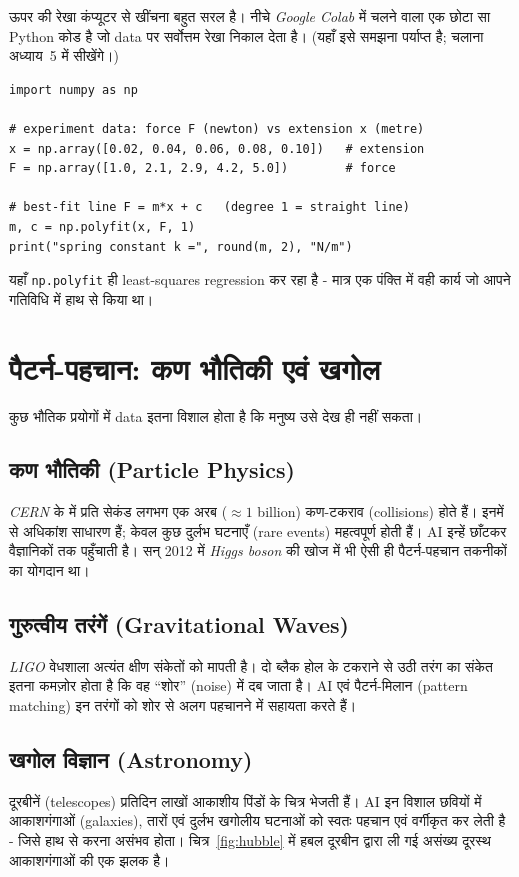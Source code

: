 ऊपर की रेखा कंप्यूटर से खींचना बहुत सरल है। नीचे \emph{Google Colab} में चलने वाला एक
छोटा सा Python कोड है जो data पर सर्वोत्तम रेखा निकाल देता है। (यहाँ इसे समझना पर्याप्त
है; चलाना अध्याय~5 में सीखेंगे।)

\begin{lstlisting}
import numpy as np

# experiment data: force F (newton) vs extension x (metre)
x = np.array([0.02, 0.04, 0.06, 0.08, 0.10])   # extension
F = np.array([1.0, 2.1, 2.9, 4.2, 5.0])        # force

# best-fit line F = m*x + c   (degree 1 = straight line)
m, c = np.polyfit(x, F, 1)
print("spring constant k =", round(m, 2), "N/m")
\end{lstlisting}

\noindent यहाँ \texttt{np.polyfit} ही least-squares regression कर रहा है - मात्र एक
पंक्ति में वही कार्य जो आपने गतिविधि में हाथ से किया था।

\section{पैटर्न-पहचान: कण भौतिकी एवं खगोल}

कुछ भौतिक प्रयोगों में data इतना विशाल होता है कि मनुष्य उसे देख ही नहीं सकता।

\subsection{कण भौतिकी (Particle Physics)}
\emph{CERN} के  में प्रति सेकंड
लगभग एक अरब ($\approx 1$ billion) कण-टकराव (collisions) होते हैं। इनमें से अधिकांश साधारण हैं; केवल कुछ दुर्लभ
घटनाएँ (rare events) महत्वपूर्ण होती हैं। AI इन्हें छाँटकर वैज्ञानिकों तक पहुँचाती है।
सन् 2012 में \emph{Higgs boson} की खोज में भी ऐसी ही पैटर्न-पहचान तकनीकों का योगदान था।

\subsection{गुरुत्वीय तरंगें (Gravitational Waves)}
\emph{LIGO} वेधशाला अत्यंत क्षीण संकेतों को मापती है। दो ब्लैक होल के टकराने से उठी
तरंग का संकेत इतना कमज़ोर होता है कि वह “शोर” (noise) में दब जाता है। AI एवं
पैटर्न-मिलान (pattern matching) इन तरंगों को शोर से अलग पहचानने में सहायता करते हैं।

\subsection{खगोल विज्ञान (Astronomy)}
दूरबीनें (telescopes) प्रतिदिन लाखों आकाशीय पिंडों के चित्र भेजती हैं। AI इन विशाल
छवियों में आकाशगंगाओं (galaxies), तारों एवं दुर्लभ खगोलीय घटनाओं को स्वतः पहचान एवं
वर्गीकृत कर लेती है - जिसे हाथ से करना असंभव होता। चित्र~\ref{fig:hubble} में हबल
दूरबीन द्वारा ली गई असंख्य दूरस्थ आकाशगंगाओं की एक झलक है।

